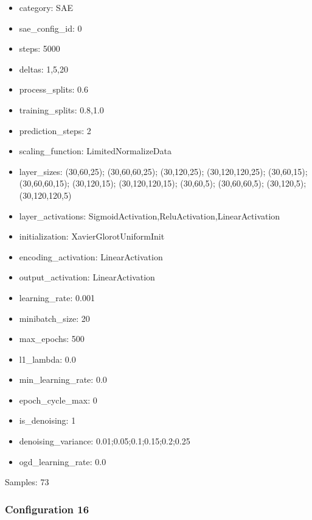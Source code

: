 \documentclass[a4paper,11pt,oneside]{article}
\theoremstyle{plain}
\theoremstyle{definition}
\begin{document}
\begin{itemize}
	\item category: SAE
	\item sae\_config\_id: 0
	\item steps: 5000
	\item deltas: 1,5,20
	\item process\_splits: 0.6
	\item training\_splits: 0.8,1.0
	\item prediction\_steps: 2
	\item scaling\_function: LimitedNormalizeData
	\item layer\_sizes: (30,60,25); (30,60,60,25); (30,120,25); (30,120,120,25); (30,60,15); (30,60,60,15); (30,120,15); (30,120,120,15); (30,60,5); (30,60,60,5); (30,120,5); (30,120,120,5)
	\item layer\_activations: SigmoidActivation,ReluActivation,LinearActivation
	\item initialization: XavierGlorotUniformInit
	\item encoding\_activation: LinearActivation
	\item output\_activation: LinearActivation
	\item learning\_rate: 0.001
	\item minibatch\_size: 20
	\item max\_epochs: 500
	\item l1\_lambda: 0.0
	\item min\_learning\_rate: 0.0
	\item epoch\_cycle\_max: 0
	\item is\_denoising: 1
	\item denoising\_variance: 0.01;0.05;0.1;0.15;0.2;0.25
	\item ogd\_learning\_rate: 0.0
\end{itemize}

Samples: 73

\subsubsection{Configuration 16}\label{config16}
\end{document}

